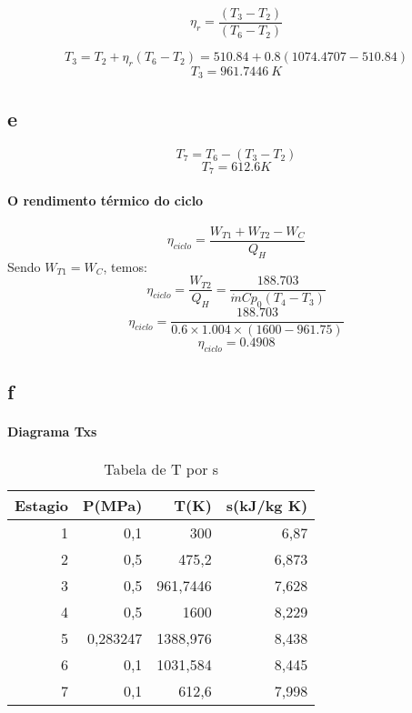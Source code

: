 \[\eta _{r} = \frac{(T_{3}-T_{2})}{(T_{6}-T_{2})}\]

\[T_{3} =  T_{2} + \eta _{r}(T_{6}-T_{2}) = 510.84 + 0.8(1074.4707-510.84) \]
\[T_{3} = 961.7446 \ K\]

\subsection{e}

\[T_{7} = T_{6}- (T_{3}-T_{2})\]
\[T_{7} = 612.6 K\]

\paragraph*{O rendimento térmico do ciclo}

\[\eta _{ciclo} = \frac{W_{T1} + W_{T2} - W_{C}}{Q_{H}}\]
Sendo $W_{T1} = W_{C}$, temos:
\[\eta _{ciclo} = \frac{ W_{T2} }{Q_{H}} = \frac{188.703}{\dot{m}Cp_{0}(T_{4}-T_{3})}\]
\[\eta _{ciclo} = \frac{188.703}{0.6 \times 1.004 \times (1600 - 961.75)}\]
\[\eta _{ciclo} = 0.4908\]

\subsection{f}
\paragraph*{Diagrama Txs}

\begin{table}[htbp]
  \centering
  \caption{Tabela de T por s}
    \begin{tabular}{rrrr}
    \toprule
    Estagio & P(MPa) & T(K)  & s(kJ/kg K) \\
    \midrule
    1     & 0,1   & 300   & 6,87 \\
    2     & 0,5   & 475,2 & 6,873 \\
    3     & 0,5   & 961,7446 & 7,628 \\
    4     & 0,5   & 1600  & 8,229 \\
    5     & 0,283247 & 1388,976 & 8,438 \\
    6     & 0,1   & 1031,584 & 8,445 \\
    7     & 0,1   & 612,6 & 7,998 \\
    \bottomrule
    \end{tabular}%
  \label{tab:1}%
\end{table}%



